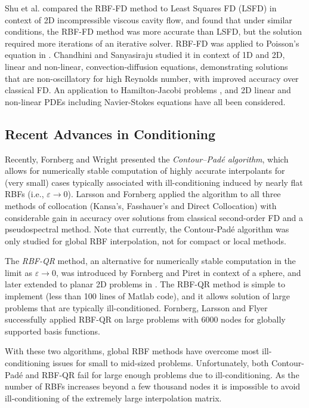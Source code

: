 \documentclass{report}
\begin{document}
{Shu et al. \cite{Shu2006} compared the RBF-FD method to Least Squares FD (LSFD) in context of 2D incompressible viscous 
cavity flow, and found that under similar conditions, the RBF-FD method was more accurate than LSFD, but the solution required 
more iterations of an iterative solver. RBF-FD was applied to Poisson's 
equation in \cite{Wright2004}.  Chandhini and Sanyasiraju \cite{Chandhini2007} studied it in context of 1D and 2D, 
linear and non-linear, 
convection-diffusion equations, demonstrating solutions that are non-oscillatory for high Reynolds number, with improved 
accuracy over classical FD. An application to Hamilton-Jacobi problems \cite{Cecil2004}, and 2D linear and non-linear PDEs 
including Navier-Stokes equations \cite{Shu2003} have all been considered. 




\subsection{Recent Advances in Conditioning}

Recently, Fornberg and Wright 
\cite{Fornberg2004} presented the \emph{Contour--Pad\'{e} algorithm}, which allows for numerically stable 
computation of highly 
accurate interpolants for (very small) cases typically associated with ill-conditioning induced by nearly flat RBFs (i.e., $\varepsilon \rightarrow 0$). Larsson and Fornberg \cite{Larsson2003} 
applied the 
algorithm to all three methods of collocation (Kansa's, Fasshauer's and Direct Collocation) with considerable gain in accuracy over solutions from classical second-order FD and a pseudospectral method. Note that currently, the Contour-Pad\'{e} 
algorithm was only studied for global RBF interpolation, not for compact or local methods. 

The \emph{RBF-QR} method, an alternative for numerically stable computation in the limit as $\varepsilon \rightarrow 0$, was introduced by Fornberg  and 
Piret \cite{Fornberg2007} in context of a sphere, and later extended to planar 2D problems in \cite{Fornberg2009b}. The 
RBF-QR 
method is simple 
to implement (less than 100 lines of Matlab code), and it allows solution of large problems that are typically ill-conditioned. Fornberg, Larsson and Flyer \cite{Fornberg2009b} successfully applied RBF-QR on large problems with 6000 nodes for globally supported basis functions. 

With these two algorithms, global RBF methods have overcome most ill-conditioning issues for small to mid-sized problems. Unfortunately, both Contour-Pad\'{e} and RBF-QR fail for large enough problems due to ill-conditioning. As the number of RBFs increases beyond a few thousand nodes it is impossible to avoid  ill-conditioning of the extremely large interpolation matrix.

}
\end{document}
